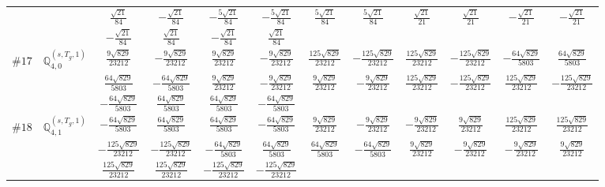 \documentclass[fleqn,9pt,landscape]{jsarticle}
\begin{document}
\begin{center}
\begin{longtable}{lcccccccccc}
& $ \frac{\sqrt{21}}{84} $ & $ - \frac{\sqrt{21}}{84} $ & $ - \frac{5 \sqrt{21}}{84} $ & $ - \frac{5 \sqrt{21}}{84} $ & $ \frac{5 \sqrt{21}}{84} $ & $ \frac{5 \sqrt{21}}{84} $ & $ \frac{\sqrt{21}}{21} $ & $ \frac{\sqrt{21}}{21} $ & $ - \frac{\sqrt{21}}{21} $ & $ - \frac{\sqrt{21}}{21} $ \\
& $ - \frac{\sqrt{21}}{84} $ & $ \frac{\sqrt{21}}{84} $ & $ - \frac{\sqrt{21}}{84} $ & $ \frac{\sqrt{21}}{84} $ & $  $ & $  $ & $  $ & $  $ & $  $ & $  $ \\ \hline
$ \#17\quad \mathbb{Q}_{4,0}^{(s,T_{g},1)} $ & $ \frac{9 \sqrt{829}}{23212} $ & $ - \frac{9 \sqrt{829}}{23212} $ & $ \frac{9 \sqrt{829}}{23212} $ & $ - \frac{9 \sqrt{829}}{23212} $ & $ \frac{125 \sqrt{829}}{23212} $ & $ - \frac{125 \sqrt{829}}{23212} $ & $ \frac{125 \sqrt{829}}{23212} $ & $ - \frac{125 \sqrt{829}}{23212} $ & $ - \frac{64 \sqrt{829}}{5803} $ & $ \frac{64 \sqrt{829}}{5803} $ \\
& $ \frac{64 \sqrt{829}}{5803} $ & $ - \frac{64 \sqrt{829}}{5803} $ & $ \frac{9 \sqrt{829}}{23212} $ & $ - \frac{9 \sqrt{829}}{23212} $ & $ \frac{9 \sqrt{829}}{23212} $ & $ - \frac{9 \sqrt{829}}{23212} $ & $ \frac{125 \sqrt{829}}{23212} $ & $ - \frac{125 \sqrt{829}}{23212} $ & $ \frac{125 \sqrt{829}}{23212} $ & $ - \frac{125 \sqrt{829}}{23212} $ \\
& $ - \frac{64 \sqrt{829}}{5803} $ & $ \frac{64 \sqrt{829}}{5803} $ & $ \frac{64 \sqrt{829}}{5803} $ & $ - \frac{64 \sqrt{829}}{5803} $ & $  $ & $  $ & $  $ & $  $ & $  $ & $  $ \\ \hline
$ \#18\quad \mathbb{Q}_{4,1}^{(s,T_{g},1)} $ & $ - \frac{64 \sqrt{829}}{5803} $ & $ \frac{64 \sqrt{829}}{5803} $ & $ \frac{64 \sqrt{829}}{5803} $ & $ - \frac{64 \sqrt{829}}{5803} $ & $ \frac{9 \sqrt{829}}{23212} $ & $ - \frac{9 \sqrt{829}}{23212} $ & $ - \frac{9 \sqrt{829}}{23212} $ & $ \frac{9 \sqrt{829}}{23212} $ & $ \frac{125 \sqrt{829}}{23212} $ & $ \frac{125 \sqrt{829}}{23212} $ \\
& $ - \frac{125 \sqrt{829}}{23212} $ & $ - \frac{125 \sqrt{829}}{23212} $ & $ - \frac{64 \sqrt{829}}{5803} $ & $ \frac{64 \sqrt{829}}{5803} $ & $ \frac{64 \sqrt{829}}{5803} $ & $ - \frac{64 \sqrt{829}}{5803} $ & $ \frac{9 \sqrt{829}}{23212} $ & $ - \frac{9 \sqrt{829}}{23212} $ & $ - \frac{9 \sqrt{829}}{23212} $ & $ \frac{9 \sqrt{829}}{23212} $ \\
& $ \frac{125 \sqrt{829}}{23212} $ & $ \frac{125 \sqrt{829}}{23212} $ & $ - \frac{125 \sqrt{829}}{23212} $ & $ - \frac{125 \sqrt{829}}{23212} $ & $  $ & $  $ & $  $ & $  $ & $  $ & $  $ \\ \hline

\end{longtable}
\end{center}
\end{document}
